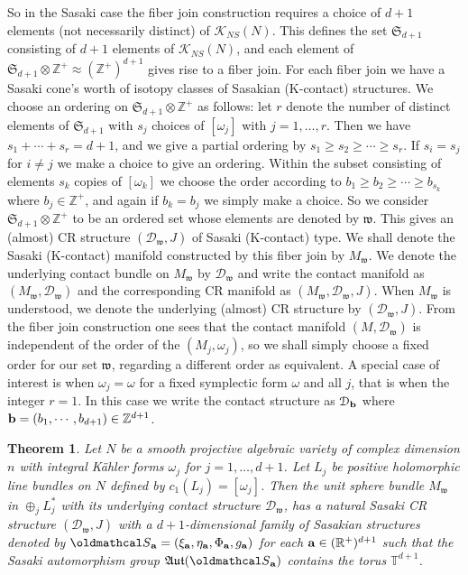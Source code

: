 \documentclass[12pt]{amsart}
\newtheorem{theorem}{Theorem}[section]
\def\bbr{{\mathbb R}}
\def\bbt{{\mathbb T}}
\def\bbz{{\mathbb Z}}
\def\gro{\omega}
\def\bfa{{\bf a}}
\def\bfb{{\bf b}}
\def\cald{{\mathcal D}}
\def\calk{{\mathcal K}}
\def\cals{{\oldmathcal S}}
\def\gt{{\mathfrak t}}
\def\gu{{\mathfrak u}}
\def\gw{{\mathfrak w}}
\def\gA{{\mathfrak A}}
\def\gS{{\mathfrak S}}
\begin{document}
So in the Sasaki case the fiber join construction requires a choice of $d+1$ elements (not necessarily distinct) of $\calk_{NS}(N)$. This defines the set $\gS_{d+1}$ consisting of $d+1$ elements of $\calk_{NS}(N)$, and each element of $\gS_{d+1}\otimes \bbz^+\approx (\bbz^+)^{d+1}$ gives rise to a fiber join.   For each fiber join we have a Sasaki cone's worth of isotopy classes of Sasakian (K-contact) structures. We choose an ordering on $\gS_{d+1}\otimes \bbz^+$ as follows: let $r$ denote the number of distinct elements of $\gS_{d+1}$ with $s_j$ choices of $[\gro_j]$ with $j=1,\ldots,r$. Then we have $s_1+\cdots +s_r=d+1$, and we give a partial ordering by $s_1\geq s_2\geq\cdots \geq s_r$. If $s_i=s_j$ for $i\neq j$ we make a choice to give an ordering. Within the subset consisting of elements $s_k$ copies of $[\gro_k]$ we choose the order according to $b_1\geq b_2\geq\cdots \geq b_{s_k}$ where $b_j\in\bbz^+$, and again if $b_k=b_j$ we simply make a choice. So we consider $\gS_{d+1}\otimes \bbz^+$ to be an ordered set whose elements are denoted by $\gw$. This gives an (almost) CR structure $(\cald_\gw,J)$ of Sasaki (K-contact) type. We shall denote the Sasaki (K-contact) manifold constructed by this fiber join by $M_\gw$. We denote the underlying contact bundle on $M_\gw$ by $\cald_\gw$ and write the contact manifold as $(M_\gw,\cald_\gw)$ and the corresponding CR manifold as $(M_\gw,\cald_\gw,J)$. When $M_\gw$ is understood, we denote the underlying (almost) CR structure by $(\cald_\gw,J)$.
From the fiber join construction one sees that the contact manifold $(M,\cald_\gw)$ is independent of the order of the $(M_j,\gro_j)$, so we shall simply choose a fixed order for our set $\gw$, regarding a different order as equivalent. A special case of interest is when $\gro_j=\gro$ for a fixed symplectic form $\gro$ and all $j$, that is when the integer $r=1$. In this case we write the contact structure as $\cald_\bfb$ where $\bfb=(b_1,\cdots,b_{d+1})\in\bbz^{d+1}$.

\begin{theorem}\label{Yamthm}
Let $N$ be a smooth projective algebraic variety of complex dimension $n$ with integral K\"ahler forms $\gro_j$ for $j=1,\ldots,d+1$. Let $L_j$ be positive holomorphic line bundles on $N$ defined by $c_1(L_j)=[\gro_j]$. Then the unit sphere bundle $M_\gw$ in $\oplus_jL^*_j$ with its underlying contact structure $\cald_\gw$, has a natural Sasaki CR structure $(\cald_\gw,J)$ with a $d+1$-dimensional family of Sasakian structures denoted by $\cals_\bfa=(\xi_\bfa,\eta_\bfa,\Phi_\bfa,g_\bfa)$ for each $\bfa\in(\bbr^+)^{d+1}$ such that the Sasaki automorphism group $\gA\gu\gt(\cals_\bfa)$ contains the torus $\bbt^{d+1}$.
\end{theorem}
\end{document}

